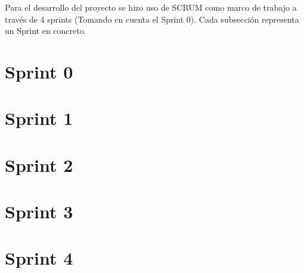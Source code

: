 


Para el desarrollo del proyecto se hizo uso de SCRUM \cite{SCRUM} como marco de trabajo a través de 4 sprints \cite{SCRUM-Sprints} (Tomando en cuenta el Sprint 0). Cada subsección representa un Sprint en concreto. 

\section{Sprint 0}
\label{chapter02-section02-sprint0}


\section{Sprint 1}
\label{chapter02-section02-sprint1}



\section{Sprint 2}
\label{chapter02-section02-sprint2}



\section{Sprint 3}
\label{chapter02-section02-sprint3}



\section{Sprint 4}
\label{chapter02-section02-sprint4}

